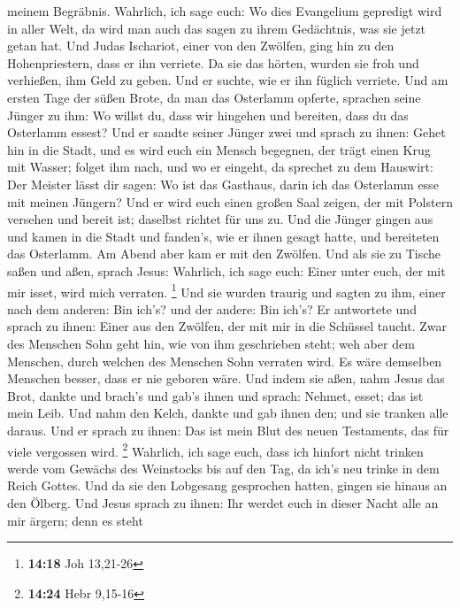 meinem Begräbnis.  Wahrlich, ich sage euch: Wo dies
Evangelium gepredigt wird in aller Welt, da wird man auch das sagen zu
ihrem Gedächtnis, was sie jetzt getan hat.  Und Judas
Ischariot, einer von den Zwölfen, ging hin zu den Hohenpriestern, dass
er ihn verriete.  Da sie das hörten, wurden sie froh und
verhießen, ihm Geld zu geben. Und er suchte, wie er ihn füglich
verriete.  Und am ersten Tage der süßen Brote, da man das
Osterlamm opferte, sprachen seine Jünger zu ihm: Wo willst du, dass wir
hingehen und bereiten, dass du das Osterlamm essest?  Und
er sandte seiner Jünger zwei und sprach zu ihnen: Gehet hin in die
Stadt, und es wird euch ein Mensch begegnen, der trägt einen Krug mit
Wasser; folget ihm nach,  und wo er eingeht, da sprechet
zu dem Hauswirt: Der Meister lässt dir sagen: Wo ist das Gasthaus, darin
ich das Osterlamm esse mit meinen Jüngern?  Und er wird
euch einen großen Saal zeigen, der mit Polstern versehen und bereit ist;
daselbst richtet für uns zu.  Und die Jünger gingen aus
und kamen in die Stadt und fanden's, wie er ihnen gesagt hatte, und
bereiteten das Osterlamm.  Am Abend aber kam er mit den
Zwölfen.  Und als sie zu Tische saßen und aßen, sprach
Jesus: Wahrlich, ich sage euch: Einer unter euch, der mit mir isset,
wird mich verraten. \footnote{\textbf{14:18} Joh 13,21-26}
 Und sie wurden traurig und sagten zu ihm, einer nach dem
anderen: Bin ich's? und der andere: Bin ich's?  Er
antwortete und sprach zu ihnen: Einer aus den Zwölfen, der mit mir in
die Schüssel taucht.  Zwar des Menschen Sohn geht hin,
wie von ihm geschrieben steht; weh aber dem Menschen, durch welchen des
Menschen Sohn verraten wird. Es wäre demselben Menschen besser, dass er
nie geboren wäre.  Und indem sie aßen, nahm Jesus das
Brot, dankte und brach's und gab's ihnen und sprach: Nehmet, esset; das
ist mein Leib.  Und nahm den Kelch, dankte und gab ihnen
den; und sie tranken alle daraus.  Und er sprach zu
ihnen: Das ist mein Blut des neuen Testaments, das für viele vergossen
wird. \footnote{\textbf{14:24} Hebr 9,15-16}  Wahrlich,
ich sage euch, dass ich hinfort nicht trinken werde vom Gewächs des
Weinstocks bis auf den Tag, da ich's neu trinke in dem Reich Gottes.
 Und da sie den Lobgesang gesprochen hatten, gingen sie
hinaus an den Ölberg.  Und Jesus sprach zu ihnen: Ihr
werdet euch in dieser Nacht alle an mir ärgern; denn es steht
